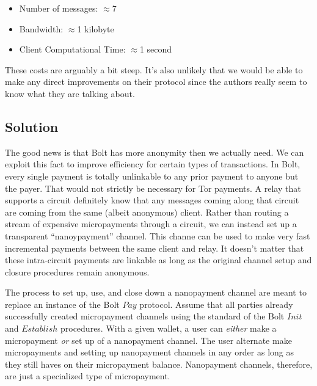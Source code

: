 \documentclass{article}
\begin{document}
\begin{itemize}
  \item Number of messages: $\approx$7
  \item Bandwidth: $\approx$1 kilobyte
  \item Client Computational Time: $\approx$1 second
\end{itemize}

These costs are arguably a bit steep. It's also unlikely that we would be able to make any direct improvements on their protocol since the authors really seem to know what they are talking about.

\subsection{Solution} The good news is that Bolt has more anonymity then we actually need. We can exploit this fact to improve efficiency for certain types of transactions. In Bolt, every single payment is totally unlinkable to any prior payment to anyone but the payer. That would not strictly be necessary for Tor payments. A relay that supports a circuit definitely know that any messages coming along that circuit are coming from the same (albeit anonymous) client. Rather than routing a stream of expensive micropayments through a circuit, we can instead set up a transparent ``nanoypayment'' channel. This channe can be used to make very fast incremental payments between the same client and relay. It doesn't matter that these intra-circuit payments are linkable as long as the original channel setup and closure procedures remain anonymous.

The process to set up, use, and close down a nanopayment channel are meant to replace an instance of the Bolt $Pay$ protocol. Assume that all parties already successfully created micropayment channels using the standard of the Bolt $Init$ and $Establish$ procedures. With a given wallet, a user can \emph{either} make a micropayment \emph{or} set up of a nanopayment channel. The user alternate make micropayments and setting up nanopayment channels in any order as long as they still haves on their micropayment balance. Nanopayment channels, therefore, are just a specialized type of micropayment.
\end{document}
